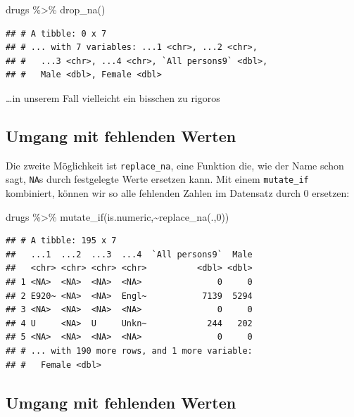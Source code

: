 \documentclass[
]{book}
\newenvironment{Shaded}{\begin{snugshade}}{\end{snugshade}}
\newcommand{\DecValTok}[1]{\textcolor[rgb]{0.00,0.00,0.81}{#1}}
\newcommand{\FunctionTok}[1]{\textcolor[rgb]{0.00,0.00,0.00}{#1}}
\newcommand{\NormalTok}[1]{#1}
\newcommand{\SpecialCharTok}[1]{\textcolor[rgb]{0.00,0.00,0.00}{#1}}
\begin{document}
\begin{Shaded}
\begin{Highlighting}[]
\NormalTok{drugs }\SpecialCharTok{\%\textgreater{}\%} 
  \FunctionTok{drop\_na}\NormalTok{()}
\end{Highlighting}
\end{Shaded}

\begin{verbatim}
## # A tibble: 0 x 7
## # ... with 7 variables: ...1 <chr>, ...2 <chr>,
## #   ...3 <chr>, ...4 <chr>, `All persons9` <dbl>,
## #   Male <dbl>, Female <dbl>
\end{verbatim}

\ldots in unserem Fall vielleicht ein bisschen zu rigoros

\hypertarget{umgang-mit-fehlenden-werten-1}{%
\subsection{Umgang mit fehlenden Werten}\label{umgang-mit-fehlenden-werten-1}}

Die zweite Möglichkeit ist \texttt{replace\_na}, eine Funktion die, wie der Name schon sagt, \texttt{NA}s durch festgelegte Werte ersetzen kann. Mit einem \texttt{mutate\_if} kombiniert, können wir so alle fehlenden Zahlen im Datensatz durch 0 ersetzen:

\begin{Shaded}
\begin{Highlighting}[]
\NormalTok{drugs }\SpecialCharTok{\%\textgreater{}\%} 
  \FunctionTok{mutate\_if}\NormalTok{(is.numeric,}\SpecialCharTok{\textasciitilde{}}\FunctionTok{replace\_na}\NormalTok{(.,}\DecValTok{0}\NormalTok{))}
\end{Highlighting}
\end{Shaded}

\begin{verbatim}
## # A tibble: 195 x 7
##   ...1  ...2  ...3  ...4  `All persons9`  Male
##   <chr> <chr> <chr> <chr>          <dbl> <dbl>
## 1 <NA>  <NA>  <NA>  <NA>               0     0
## 2 E920~ <NA>  <NA>  Engl~           7139  5294
## 3 <NA>  <NA>  <NA>  <NA>               0     0
## 4 U     <NA>  U     Unkn~            244   202
## 5 <NA>  <NA>  <NA>  <NA>               0     0
## # ... with 190 more rows, and 1 more variable:
## #   Female <dbl>
\end{verbatim}

\hypertarget{umgang-mit-fehlenden-werten-2}{%
\subsection{Umgang mit fehlenden Werten}\label{umgang-mit-fehlenden-werten-2}}
\end{document}
